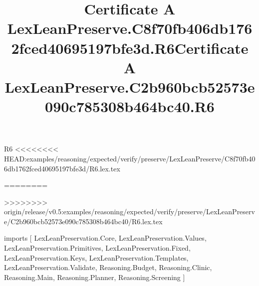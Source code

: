 \begin{lexlean}{R6}
<<<<<<<< HEAD:examples/reasoning/expected/verify/preserve/LexLeanPreserve/C8f70fb406db1762fced40695197bfe3d/R6.lex.tex
\title{Certificate A LexLeanPreserve.C8f70fb406db1762fced40695197bfe3d.R6}
========
\title{Certificate A LexLeanPreserve.C2b960bcb52573e090c785308b464bc40.R6}
>>>>>>>> origin/release/v0.5:examples/reasoning/expected/verify/preserve/LexLeanPreserve/C2b960bcb52573e090c785308b464bc40/R6.lex.tex
\begin{coremodule}
imports [
  LexLeanPreservation.Core,
  LexLeanPreservation.Values,
  LexLeanPreservation.Primitives,
  LexLeanPreservation.Fixed,
  LexLeanPreservation.Keys,
  LexLeanPreservation.Templates,
  LexLeanPreservation.Validate,
  Reasoning.Budget,
  Reasoning.Clinic,
  Reasoning.Main,
  Reasoning.Planner,
  Reasoning.Screening
]


\end{coremodule}
\end{lexlean}

